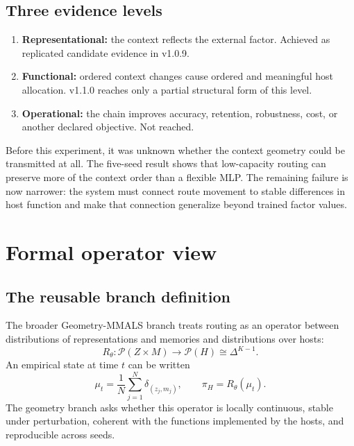 \documentclass[11pt,a4paper]{article}
\newcommand{\Pcal}{\mathcal{P}}
\begin{document}
\subsection{Three evidence levels}
\begin{enumerate}
\item \textbf{Representational:} the context reflects the external factor. Achieved as replicated candidate evidence in v1.0.9.
\item \textbf{Functional:} ordered context changes cause ordered and meaningful host allocation. v1.1.0 reaches only a partial structural form of this level.
\item \textbf{Operational:} the chain improves accuracy, retention, robustness, cost, or another declared objective. Not reached.
\end{enumerate}

\begin{positivebox}
Before this experiment, it was unknown whether the context geometry could be transmitted at all. The five-seed result shows that low-capacity routing can preserve more of the context order than a flexible MLP. The remaining failure is now narrower: the system must connect route movement to stable differences in host function and make that connection generalize beyond trained factor values.
\end{positivebox}

\section{Formal operator view}
\subsection{The reusable branch definition}
The broader Geometry-MMALS branch treats routing as an operator between distributions of representations and memories and distributions over hosts:
\begin{equation}
R_\theta:\Pcal(Z\times M)\longrightarrow\Pcal(H)\cong\Delta^{K-1}.
\end{equation}
An empirical state at time $t$ can be written
\begin{equation}
\mu_t=\frac1N\sum_{j=1}^{N}\delta_{(z_j,m_j)},
\qquad
\pi_H=R_\theta(\mu_t).
\end{equation}
The geometry branch asks whether this operator is locally continuous, stable under perturbation, coherent with the functions implemented by the hosts, and reproducible across seeds.
\end{document}
